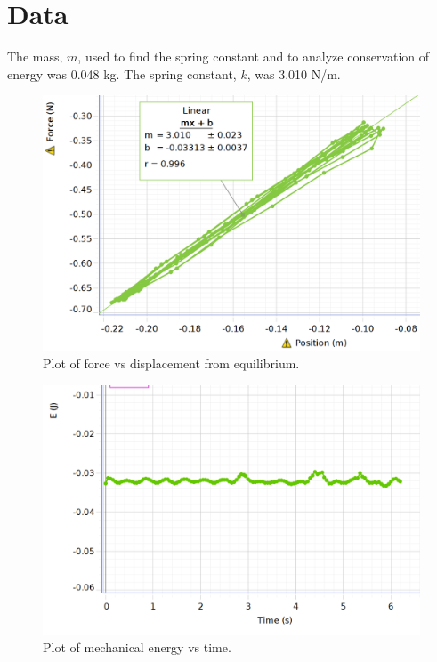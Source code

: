 \documentclass[12pt]{article}
\begin{document}
    \section{Data}
        The mass, \(m\), used to find the spring constant and to analyze conservation of energy was 0.048 kg. The spring constant, \(k\), was 3.010 N/m.
        \begin{figure}[H]
            \centering
            \includegraphics[width=0.78\linewidth]{fx.png}
            \caption{Plot of force vs displacement from equilibrium.}
        \end{figure}
        \begin{figure}[H]
            \centering
            \includegraphics[width=0.78\linewidth]{et.png}
            \caption{Plot of mechanical energy vs time.}
        \end{figure}
\end{document}

